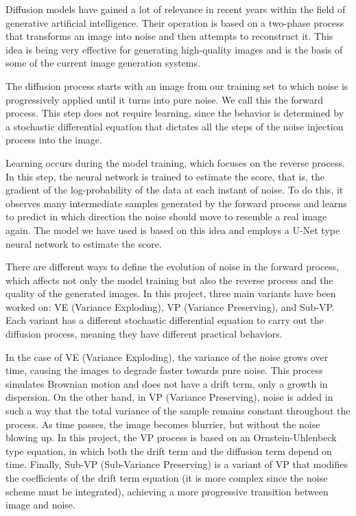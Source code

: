 \documentclass[11pt,a4paper]{article}
\begin{document}
Diffusion models have gained a lot of relevance in recent years within the field of generative artificial intelligence. Their operation is based on a two-phase process that transforms an image into noise and then attempts to reconstruct it. This idea is being very effective for generating high-quality images and is the basis of some of the current image generation systems.

The diffusion process starts with an image from our training set to which noise is progressively applied until it turns into pure noise. We call this the forward process. This step does not require learning, since the behavior is determined by a stochastic differential equation that dictates all the steps of the noise injection process into the image.

Learning occurs during the model training, which focuses on the reverse process. In this step, the neural network is trained to estimate the score, that is, the gradient of the log-probability of the data at each instant of noise. To do this, it observes many intermediate samples generated by the forward process and learns to predict in which direction the noise should move to resemble a real image again. The model we have used is based on this idea and employs a U-Net type neural network to estimate the score.

There are different ways to define the evolution of noise in the forward process, which affects not only the model training but also the reverse process and the quality of the generated images. In this project, three main variants have been worked on: VE (Variance Exploding), VP (Variance Preserving), and Sub-VP. Each variant has a different stochastic differential equation to carry out the diffusion process, meaning they have different practical behaviors.

In the case of VE (Variance Exploding), the variance of the noise grows over time, causing the images to degrade faster towards pure noise. This process simulates Brownian motion and does not have a drift term, only a growth in dispersion. On the other hand, in VP (Variance Preserving), noise is added in such a way that the total variance of the sample remains constant throughout the process. As time passes, the image becomes blurrier, but without the noise blowing up. In this project, the VP process is based on an Ornstein-Uhlenbeck type equation, in which both the drift term and the diffusion term depend on time. Finally, Sub-VP (Sub-Variance Preserving) is a variant of VP that modifies the coefficients of the drift term equation (it is more complex since the noise scheme must be integrated), achieving a more progressive transition between image and noise.
\end{document}
